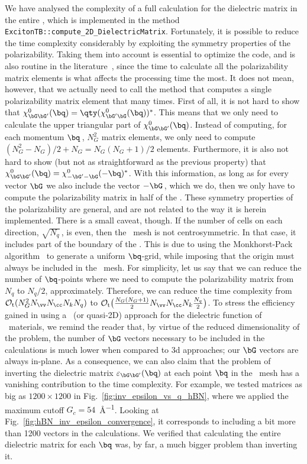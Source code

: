 We have analysed the complexity of a full calculation for the dielectric matrix in the entire \bz, which is implemented in the method \texttt{ExcitonTB::compute\_2D\_DielectricMatrix}.
Fortunately, it is possible to reduce the time complexity considerably by exploiting the symmetry properties of the polarizability.
Taking them into account is essential to optimize the code, and is also routine in the literature~\cite{BerkeleyGW,Guandalini_Varsano_2023}, since the time to calculate all the polarizability matrix elements is what affects the processing time the most.
It does not mean, however, that we actually need to call the method that computes a single polarizability matrix element that many times.
First of all, it is not hard to show that $\chi^0_{\bG \bG'} (\bq) = \qty(\chi^0_{\bG' \bG} (\bq))^*$.
This means that we only need to calculate the upper triangular part of $\chi^0_{\bG \bG'} (\bq)$.
Instead of computing, for each momentum $\bq$\,, $N_{G}^2$ matrix elements, we only need to compute $(N_{G}^2 - N_{G})/2 + N_{G} = N_{G}(N_{G} + 1)/2$ elements.
Furthermore, it is also not hard to show (but not as straightforward as the previous property) that $\chi^0_{\bG \bG'} (\bq) = \chi^0_{-\bG' -\bG} (-\bq)^*$.
With this information, as long as for every vector $\bG$ we also include the vector $-\bG$\,, which we do, then we only have to compute the polarizability matrix in half of the \bz\@.
These symmetry properties of the polarizability are general, and are not related to the way it is herein implemented.
There is a small caveat, though.
If the number of cells on each direction, $\sqrt{N_{q}}$\,, is even, then the \bz~mesh is not centrosymmetric.
In that case, it includes part of the boundary of the \bz\@.
This is due to using the Monkhorst-Pack algorithm~\cite{Monkhorst_Pack_1976} to generate a uniform $\bq$-grid, while imposing that the origin must always be included in the \bz~mesh.
For simplicity, let us say that we can reduce the number of $\bq$-points where we need to compute the polarizability matrix from $N_{q}$ to $N_{q}/2$, approximately.
Therefore, we can reduce the time complexity from $\mathcal{O}_{\mathrm{t}} (N_{G}^2 N_{\vv} N_{\cc} N_{k} N_{q})$ to $\mathcal{O}_{\mathrm{t}}\big(\frac{N_{G}(N_{G} + 1)}{2} N_{\vv} N_{\cc} N_{k} \frac{N_{q}}{2}\big)$.
To stress the efficiency gained in using a \bd~(or quasi-2D) approach for the dielectric function of \bd~materials, we remind the reader that, by virtue of the reduced dimensionality of the problem, the number of $\bG$ vectors necessary to be included in the calculations is much lower when compared to \gls{3d} approaches; our $\bG$ vectors are always in-plane.
As a consequence, we can also claim that the problem of inverting the dielectric matrix $\varepsilon_{\bG \bG'}(\bq)$ at each point $\bq$ in the \bz~mesh has a vanishing contribution to the time complexity.
For example, we tested matrices as big as $1200 \times 1200$ in Fig.~\ref{fig:inv_epsilon_vs_q_hBN}, where we applied the maximum cutoff $G_c = 54$~\unit{\angstrom^{-1}}.
Looking at Fig.~\ref{fig:hBN_inv_epsilon_convergence}, it corresponds to including a bit more than 1200 vectors in the calculations.
We verified that calculating the entire dielectric matrix for each $\bq$ was, by far, a much bigger problem than inverting it.

